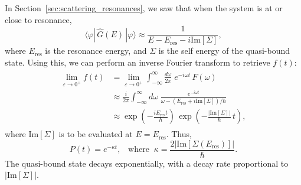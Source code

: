\documentclass[pra,12pt]{revtex4-2}
\begin{document}
In Section~\ref{sec:scattering_resonances}, we saw that when the
system is at or close to resonance,
\begin{equation}
  \langle\varphi|\,\hat{G}(E)\,|\varphi\rangle \approx \frac{1}{\displaystyle E - E_{\mathrm{res}} - i \mathrm{Im}[\Sigma]},
\end{equation}
where $E_{\mathrm{res}}$ is the resonance energy, and $\Sigma$ is the
self energy of the quasi-bound state.  Using this, we can perform an
inverse Fourier transform to retrieve $f(t)$:
\begin{align}
  \begin{aligned} \lim_{\varepsilon\rightarrow 0^+} f(t) &= \lim_{\varepsilon\rightarrow 0^+} \int_{-\infty}^{\infty} \frac{d\omega}{2\pi} \; e^{-i\omega t} \, F(\omega) \\
    &\approx \frac{i}{2\pi} \int_{-\infty}^{\infty} d\omega\; \frac{e^{-i\omega t}}{\omega - (E_{\mathrm{res}}+i \mathrm{Im}[\Sigma])/\hbar} \\
    &\approx \exp\left(-\frac{iE_{\mathrm{res}}t}{\hbar}\right)\, \exp\left(-\frac{|\mathrm{Im}[\Sigma]|}{\hbar}\,t\right),
  \end{aligned}
\end{align}
where $\mathrm{Im}[\Sigma]$ is to be evaluated at $E =
E_{\mathrm{res}}$.  Thus,
\begin{equation}
  P(t) = e^{-\kappa t}, \;\;\;\mathrm{where}\;\;\kappa
  = \frac{2\big|\mathrm{Im}[\Sigma(E_{\mathrm{res}})]\big|}{\hbar}.
  \label{Ptresult}
\end{equation}
The quasi-bound state decays exponentially, with a decay rate
proportional to $|\mathrm{Im}[\Sigma]|$.
\end{document}
